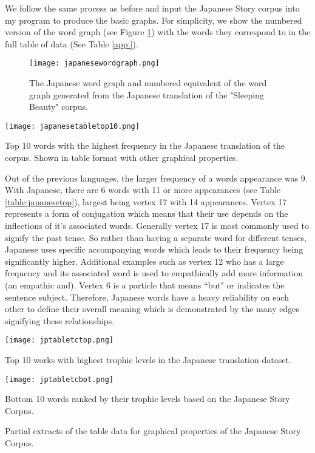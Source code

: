 We follow the same process as before and input the Japanese Story corpus into my program to produce the basic graphs. For simplicity, we show the numbered version of the word graph (see Figure \ref{fig:jpgraph}) with the words they correspond to in the full table of data (See Table \ref{app:}).

\begin{figure}[H]
\centering
\texttt{[image: japanesewordgraph.png]}
\caption{The Japanese word graph and numbered equivalent of the word graph generated from the Japanese translation of the "Sleeping Beauty" corpus.}
\label{fig:jpgraph}
\end{figure}

\begin{table}[H]
\centering
\texttt{[image: japanesetabletop10.png]}
\caption{Top 10 words with the highest frequency in the Japanese translation of the corpus. Shown in table format with other graphical properties. }
\label{table:japanesetop}
\end{table}

Out of the previous languages, the larger frequency of a words appearance was 9. With Japanese, there are 6 words with 11 or more appearances (see Table \ref{table:japanesetop}), largest being vertex 17 with 14 appearances. Vertex 17 represents a form of conjugation which means that their use depends on the inflections of it's associated words. Generally vertex 17 is most commonly used to signify the past tense. So rather than having a separate word for different tenses, Japanese uses specific accompanying words which leads to their frequency being significantly higher. Additional examples such as vertex 12 who has a large frequency and its associated word is used to empathically add more information (an empathic and). Vertex 6 is a particle that means ``but" or indicates the sentence subject. Therefore, Japanese words have a heavy reliability on each other to define their overall meaning which is demonstrated by the many edges signifying these relationships.

\begin{table}[H]
\centering
\begin{subtable}{.45\textwidth}
	\centering
	\texttt{[image: jptabletctop.png]}
	\caption{Top 10 works with highest trophic levels in the Japanese translation dataset.}
	\label{table:japanesentoptc}
\end{subtable}
\hfill
\begin{subtable}{.45\textwidth}
	\centering
	\texttt{[image: jptabletcbot.png]}
	\caption{Bottom 10 words ranked by their trophic levels based on the Japanese Story Corpus.}
	\label{table:japanesebottc}
\end{subtable}
\caption{Partial extracts of the table data for graphical properties of the Japanese Story Corpus.}
\end{table}

